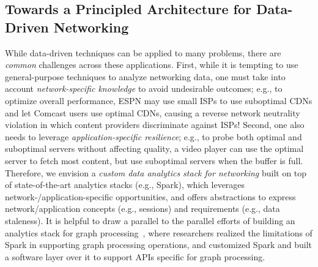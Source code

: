 \subsection{Towards a Principled Architecture for Data-Driven Networking}
\label{subsec:concl:future:principled}


While data-driven techniques can be applied to many problems, there are {\em common} 
challenges across these applications.
First, while it is tempting to use general-purpose techniques to analyze networking data, 
one must take into account {\em network-specific knowledge} to avoid undesirable outcomes; 
e.g., to optimize overall performance, ESPN may use small ISPs to use suboptimal CDNs 
and let Comcast users use optimal CDNs, causing a reverse network neutrality violation 
in which content providers discriminate against ISPs!
Second, one also needs to leverage {\em application-specific resilience}; e.g., to probe 
both optimal and suboptimal servers without affecting quality, a video player can use the 
optimal server to fetch most content, but use suboptimal servers when the buffer is full. 
Therefore, we envision a {\em custom data analytics stack for networking} built on top of 
state-of-the-art analytics stacks (e.g., Spark), which leverages network-/application-specific 
opportunities, and offers abstractions to express network/application concepts (e.g., sessions) 
and requirements (e.g., data staleness).
It is helpful to draw a parallel to the parallel efforts of building an analytics stack for graph 
processing~\cite{graphx}, where researchers realized the limitations of Spark in supporting 
graph processing operations, and customized Spark and built a software layer over it to 
support APIs specific for graph processing.

